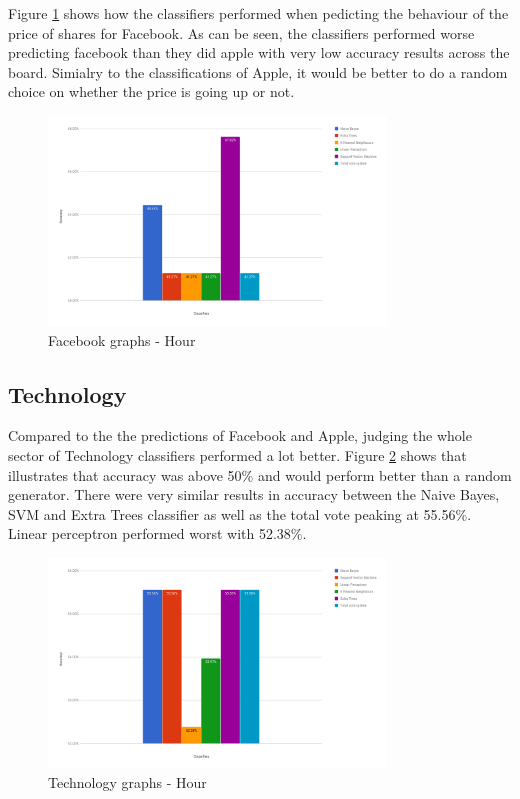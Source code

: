 \documentclass[a4paper,11pt]{report}
\begin{document}
Figure \ref{facebook-hour} shows how the classifiers performed when pedicting the behaviour of the price of shares for Facebook. As can be seen, the classifiers performed worse predicting facebook than they did apple with very low accuracy results across the board. Simialry to the classifications of Apple, it would be better to do a random choice on whether the price is going up or not.

\begin{figure}[h!]
	\label{facebook-hour}
  \centering
  	\includegraphics[width=0.80\textwidth]{facebook-hour.png}
  \caption{Facebook graphs - Hour}
\end{figure}

\subsection{Technology}

Compared to the the predictions of Facebook and Apple, judging the whole sector of Technology classifiers performed a lot better. Figure \ref{technology-hour} shows that illustrates that accuracy was above 50\% and would perform better than a random generator. There were very similar results in accuracy between the Naive Bayes, SVM and Extra Trees classifier as well as the total vote peaking at 55.56\%. Linear perceptron performed worst with 52.38\%.


\begin{figure}[h!]
	\label{technology-hour}
  \centering
  	\includegraphics[width=0.80\textwidth]{technology-hour.png}
  \caption{Technology graphs - Hour}
\end{figure}
\end{document}
